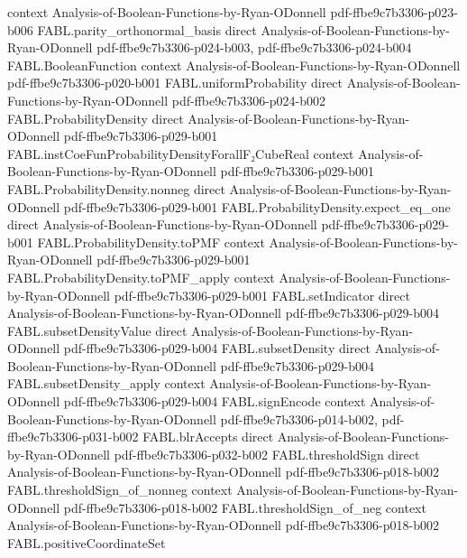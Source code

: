 \begin{theorem}
  {context}
  {Analysis-of-Boolean-Functions-by-Ryan-ODonnell}
  {pdf-ffbe9c7b3306-p023-b006}
\proofstep
  {FABL.parity_orthonormal_basis}
  {direct}
  {Analysis-of-Boolean-Functions-by-Ryan-ODonnell}
  {pdf-ffbe9c7b3306-p024-b003,
    pdf-ffbe9c7b3306-p024-b004}
\proofstep
  {FABL.BooleanFunction}
  {context}
  {Analysis-of-Boolean-Functions-by-Ryan-ODonnell}
  {pdf-ffbe9c7b3306-p020-b001}
\proofstep
  {FABL.uniformProbability}
  {direct}
  {Analysis-of-Boolean-Functions-by-Ryan-ODonnell}
  {pdf-ffbe9c7b3306-p024-b002}
\proofstep
  {FABL.ProbabilityDensity}
  {direct}
  {Analysis-of-Boolean-Functions-by-Ryan-ODonnell}
  {pdf-ffbe9c7b3306-p029-b001}
\proofstep
  {FABL.instCoeFunProbabilityDensityForallF₂CubeReal}
  {context}
  {Analysis-of-Boolean-Functions-by-Ryan-ODonnell}
  {pdf-ffbe9c7b3306-p029-b001}
\proofstep
  {FABL.ProbabilityDensity.nonneg}
  {direct}
  {Analysis-of-Boolean-Functions-by-Ryan-ODonnell}
  {pdf-ffbe9c7b3306-p029-b001}
\proofstep
  {FABL.ProbabilityDensity.expect_eq_one}
  {direct}
  {Analysis-of-Boolean-Functions-by-Ryan-ODonnell}
  {pdf-ffbe9c7b3306-p029-b001}
\proofstep
  {FABL.ProbabilityDensity.toPMF}
  {context}
  {Analysis-of-Boolean-Functions-by-Ryan-ODonnell}
  {pdf-ffbe9c7b3306-p029-b001}
\proofstep
  {FABL.ProbabilityDensity.toPMF_apply}
  {context}
  {Analysis-of-Boolean-Functions-by-Ryan-ODonnell}
  {pdf-ffbe9c7b3306-p029-b001}
\proofstep
  {FABL.setIndicator}
  {direct}
  {Analysis-of-Boolean-Functions-by-Ryan-ODonnell}
  {pdf-ffbe9c7b3306-p029-b004}
\proofstep
  {FABL.subsetDensityValue}
  {direct}
  {Analysis-of-Boolean-Functions-by-Ryan-ODonnell}
  {pdf-ffbe9c7b3306-p029-b004}
\proofstep
  {FABL.subsetDensity}
  {direct}
  {Analysis-of-Boolean-Functions-by-Ryan-ODonnell}
  {pdf-ffbe9c7b3306-p029-b004}
\proofstep
  {FABL.subsetDensity_apply}
  {context}
  {Analysis-of-Boolean-Functions-by-Ryan-ODonnell}
  {pdf-ffbe9c7b3306-p029-b004}
\proofstep
  {FABL.signEncode}
  {context}
  {Analysis-of-Boolean-Functions-by-Ryan-ODonnell}
  {pdf-ffbe9c7b3306-p014-b002,
    pdf-ffbe9c7b3306-p031-b002}
\proofstep
  {FABL.blrAccepts}
  {direct}
  {Analysis-of-Boolean-Functions-by-Ryan-ODonnell}
  {pdf-ffbe9c7b3306-p032-b002}
\proofstep
  {FABL.thresholdSign}
  {direct}
  {Analysis-of-Boolean-Functions-by-Ryan-ODonnell}
  {pdf-ffbe9c7b3306-p018-b002}
\proofstep
  {FABL.thresholdSign_of_nonneg}
  {context}
  {Analysis-of-Boolean-Functions-by-Ryan-ODonnell}
  {pdf-ffbe9c7b3306-p018-b002}
\proofstep
  {FABL.thresholdSign_of_neg}
  {context}
  {Analysis-of-Boolean-Functions-by-Ryan-ODonnell}
  {pdf-ffbe9c7b3306-p018-b002}
\proofstep
  {FABL.positiveCoordinateSet}

\end{theorem}
